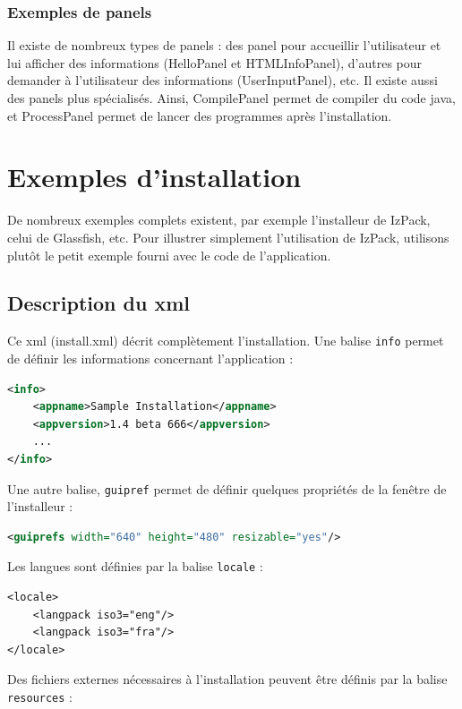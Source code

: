 \subsubsection{Exemples de panels}
Il existe de nombreux types de panels : des panel pour accueillir l'utilisateur et lui afficher des informations (HelloPanel et HTMLInfoPanel), d'autres pour demander à l'utilisateur des informations (UserInputPanel), etc.
Il existe aussi des panels plus spécialisés. Ainsi, CompilePanel permet de compiler du code java, et ProcessPanel permet de lancer des programmes après l'installation.


\section{Exemples d'installation}
De nombreux exemples complets existent, par exemple l'installeur de IzPack, celui de Glassfish, etc. Pour illustrer simplement l'utilisation de IzPack, utilisons plutôt le petit exemple fourni avec le code de l'application.

\subsection{Description du xml}
Ce xml (install.xml) décrit complètement l'installation.
Une balise \verb|info| permet de définir les informations concernant l'application : 
\begin{lstlisting}[language=xml]
<info>
	<appname>Sample Installation</appname>
	<appversion>1.4 beta 666</appversion>
	...
</info>
\end{lstlisting}
Une autre balise, \verb|guipref| permet de définir quelques propriétés de la fenêtre de l'installeur :
\begin{lstlisting}[language=xml]
<guiprefs width="640" height="480" resizable="yes"/>
\end{lstlisting}
Les langues sont définies par la balise \verb|locale| :
\begin{lstlisting}
<locale>
	<langpack iso3="eng"/>
	<langpack iso3="fra"/>
</locale>
\end{lstlisting}
Des fichiers externes nécessaires à l'installation peuvent être définis par la balise \verb|resources| :


